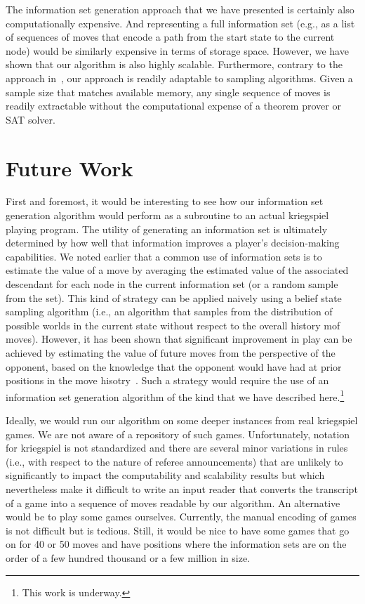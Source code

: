 \documentclass[11pt]{article}
\begin{document}
The information set generation approach that we have presented is certainly also computationally expensive.  And
representing a full information set (e.g., as a list of sequences of moves that encode a path from the start state to
the current node) would be similarly expensive in terms of storage space.  However, we have shown that our algorithm is
also highly scalable.  Furthermore, contrary to the approach in~\cite{nance06reasoning}, our approach is readily
adaptable to sampling algorithms.  Given a sample size that matches available memory, any single sequence of moves is
readily extractable without the computational expense of a theorem prover or SAT solver.

\section{Future Work}

First and foremost, it would be interesting to see how our information set generation algorithm would perform as a
subroutine to an actual kriegspiel playing program.  The utility of generating an information set is ultimately
determined by how well that information improves a player's decision-making capabilities.  We noted earlier that a
common use of information sets is to estimate the value of a move by averaging the estimated value of the associated
descendant for each node in the current information set (or a random sample from the set).  This kind of strategy can be
applied naively using a belief state sampling algorithm (i.e., an algorithm that samples from the distribution of
possible worlds in the current state without respect to the overall history mof moves).  However, it has been shown that
significant improvement in play can be achieved by estimating the value of future moves from the perspective of the
opponent, based on the knowledge that the opponent would have had at prior positions in the move
hisotry~\cite{richards07opponent}.  Such a strategy would require the use of an information set generation algorithm of the
kind that we have described here.\footnote{This work is underway.}

Ideally, we would run our algorithm on some deeper instances from real kriegspiel games.  We are not aware of a
repository of such games.  Unfortunately, notation for kriegspiel is not standardized and there are several minor
variations in rules (i.e., with respect to the nature of referee announcements) that are unlikely to significantly to
impact the computability and scalability results but which nevertheless make it difficult to write an input reader that
converts the transcript of a game into a sequence of moves readable by our algorithm.  An alternative would be to play
some games ourselves.  Currently, the manual encoding of games is not difficult but is tedious.  Still, it would be nice
to have some games that go on for 40 or 50 moves and have positions where the information sets are on the order of a few
hundred thousand or a few million in size.
\end{document}
